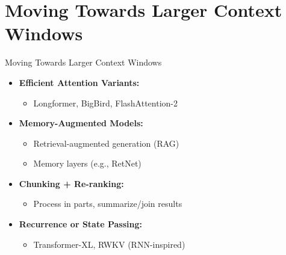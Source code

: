 \section{Moving Towards Larger Context Windows}
\begin{frame}{Moving Towards Larger Context Windows}
    \begin{itemize}
        \item \textbf{Efficient Attention Variants:}
        \begin{itemize}
            \item Longformer, BigBird, FlashAttention-2
        \end{itemize}
        \item \textbf{Memory-Augmented Models:}
        \begin{itemize}
            \item Retrieval-augmented generation (RAG)
            \item Memory layers (e.g., RetNet)
        \end{itemize}
        \item \textbf{Chunking + Re-ranking:}
        \begin{itemize}
            \item Process in parts, summarize/join results
        \end{itemize}
        \item \textbf{Recurrence or State Passing:}
        \begin{itemize}
            \item Transformer-XL, RWKV (RNN-inspired)
        \end{itemize}
    \end{itemize}
\end{frame}